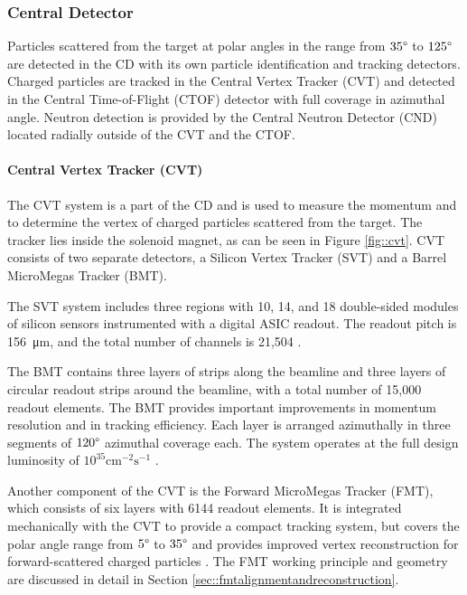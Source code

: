 \subsubsection{Central Detector} \label{sssec::centraldetector}
    Particles scattered from the target at polar angles in the range from $35\degree$ to $125\degree$ are detected in the CD with its own particle identification and tracking detectors.
    Charged particles are tracked in the Central Vertex Tracker (CVT) and detected in the Central Time-of-Flight (CTOF) detector with full coverage in azimuthal angle.
    Neutron detection is provided by the Central Neutron Detector (CND) located radially outside of the CVT and the CTOF.

\paragraph{Central Vertex Tracker (CVT)}
    The CVT system is a part of the CD and is used to measure the momentum and to determine the vertex of charged particles scattered from the target.
    The tracker lies inside the solenoid magnet, as can be seen in Figure \ref{fig::cvt}.
    CVT consists of two separate detectors, a Silicon Vertex Tracker (SVT) and a
    Barrel MicroMegas Tracker (BMT).

    The SVT system includes three regions with 10, 14, and 18 double-sided modules of silicon sensors instrumented with a digital ASIC readout.
    The readout pitch is \SI{156}{\micro\metre}, and the total number of channels is 21,504 \cite{antonioli2020}.

    The BMT contains three layers of strips along the beamline and three layers of circular readout strips around the beamline, with a total number of 15,000 readout elements.
    The BMT provides important improvements in momentum resolution and in tracking efficiency. 
    Each layer is arranged azimuthally in three segments of $120\degree$ azimuthal coverage each.
    The system operates at the full design luminosity of $10^{35} \text{cm}^{-2}\text{s}^{-1}$ \cite{acker2020mvt}.

    Another component of the CVT is the Forward MicroMegas Tracker (FMT), which consists of six layers with 6144 readout elements.
    It is integrated mechanically with the CVT to provide a compact tracking system, but covers the polar angle range from $5\degree$ to $35\degree$ and provides improved vertex reconstruction for forward-scattered charged particles \cite{acker2020mvt}.
    The FMT working principle and geometry are discussed in detail in Section \ref{sec::fmtalignmentandreconstruction}.

